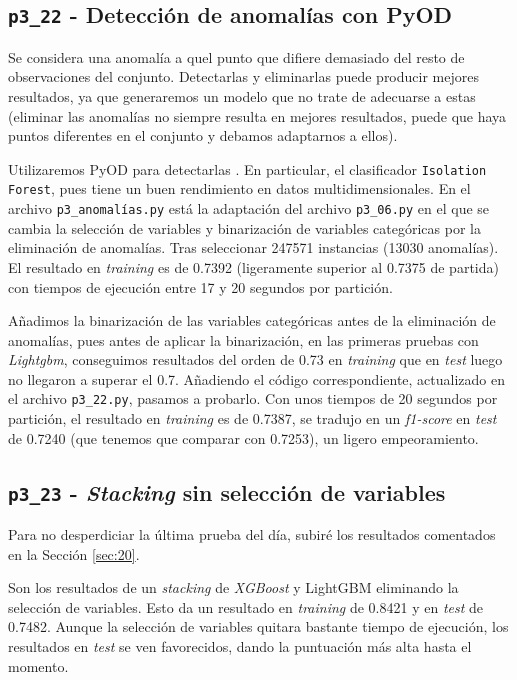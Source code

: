\documentclass[a4paper, 20pt]{article}
\begin{document}
\subsection{\texttt{p3\_22} - Detección de anomalías con PyOD}

Se considera una anomalía a quel punto que difiere demasiado del resto de observaciones del conjunto. Detectarlas y eliminarlas puede producir mejores resultados, ya que generaremos un modelo que no trate de adecuarse a estas (eliminar las anomalías no siempre resulta en mejores resultados, puede que haya puntos diferentes en el conjunto y debamos adaptarnos a ellos).

Utilizaremos PyOD para detectarlas \cite{noauthor_tutorial_2019}. En particular, el clasificador \texttt{Isolation Forest}, pues tiene un buen rendimiento en datos multidimensionales. En el archivo \texttt{p3\_anomalías.py} está la adaptación del archivo \texttt{p3\_06.py} en el que se cambia la selección de variables y binarización de variables categóricas por la eliminación de anomalías. Tras seleccionar 247571 instancias (13030 anomalías). El resultado en \textit{training} es de 0.7392 (ligeramente superior al 0.7375 de partida) con tiempos de ejecución entre 17 y 20 segundos por partición.

Añadimos la binarización de las variables categóricas antes de la eliminación de anomalías, pues antes de aplicar la binarización, en las primeras pruebas con \textit{Lightgbm}, conseguimos resultados del orden de 0.73 en \textit{training} que en \textit{test} luego no llegaron a superar el 0.7. Añadiendo el código correspondiente, actualizado en el archivo \texttt{p3\_22.py}, pasamos a probarlo. Con unos tiempos de 20 segundos por partición, el resultado en \textit{training} es de 0.7387, se tradujo en un \textit{f1-score} en \textit{test} de 0.7240 (que tenemos que comparar con 0.7253), un ligero empeoramiento.

\subsection{\texttt{p3\_23} - \textit{Stacking} sin selección de variables}

Para no desperdiciar la última prueba del día, subiré los resultados comentados en la Sección \ref{sec:20}.

Son los resultados de un \textit{stacking} de \textit{XGBoost} y LightGBM eliminando la selección de variables. Esto da un resultado en \textit{training} de 0.8421 y en \textit{test} de 0.7482. Aunque la selección de variables quitara bastante tiempo de ejecución, los resultados en \textit{test} se ven favorecidos, dando la puntuación más alta hasta el momento.
\end{document}
